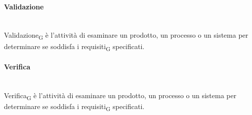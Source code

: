 \paragraph{Validazione}~\smallskip \\
Validazione\textsubscript{G} è l'attività di esaminare un prodotto, un processo o un sistema per determinare se soddisfa i requisiti\textsubscript{G} specificati.

\paragraph{Verifica}~\smallskip \\
Verifica\textsubscript{G} è l'attività di esaminare un prodotto, un processo o un sistema per determinare se soddisfa i requisiti\textsubscript{G} specificati.




